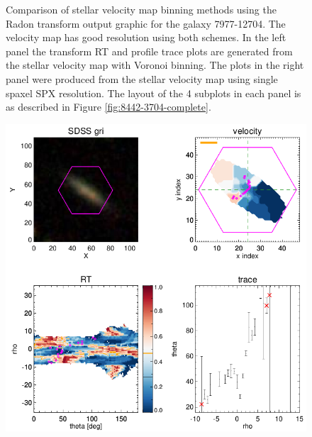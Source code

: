 \begin{figure}
    \caption[Comparison of velocity map binning schemes for a high resolution map]{Comparison of stellar velocity map binning methods using the Radon transform output graphic for the galaxy 7977-12704. The velocity map has good resolution using both schemes. In the left panel the transform RT and profile trace plots are generated from the stellar velocity map with Voronoi binning. The plots in the right panel were produced from the stellar velocity map using single spaxel SPX resolution. The layout of the 4 subplots in each panel is as described in Figure \ref{fig:8442-3704-complete}.}
    \label{fig:binning-comparison}
\end{figure}

\begin{figure}
    \centering
    \includegraphics[width=\columnwidth]{images/RadonPlots/RT-SNIPS-NEW/8993-6104-VOR10-MILESHC-MILESHC-1-SNIP.png}

\end{figure}
